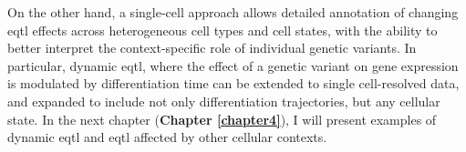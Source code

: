 On the other hand, a single-cell approach allows detailed annotation of changing \gls{eqtl} effects across heterogeneous cell types and cell states, with the ability to better interpret the context-specific role of individual genetic variants. 
In particular, dynamic \gls{eqtl}, where the effect of a genetic variant on gene expression is modulated by differentiation time \cite{francesconi2014effects, strober2019dynamic} can be extended to single cell-resolved data, and expanded to include not only differentiation trajectories, but any cellular state.
In the next chapter (\textbf{Chapter \ref{chapter4}}), I will present examples of dynamic \gls{eqtl} and \gls{eqtl} affected by other cellular contexts.